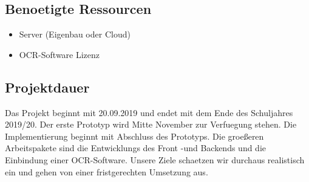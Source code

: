 \documentclass[12pt]{article}
\theoremstyle{definition}
\begin{document}
\subsection{Benoetigte Ressourcen}

\begin{itemize}
\item Server (Eigenbau oder Cloud)
\item OCR-Software Lizenz
\end{itemize}

\subsection{Projektdauer}
Das Projekt beginnt mit 20.09.2019 und endet mit dem Ende des Schuljahres 2019/20. Der erste Prototyp wird Mitte November zur Verfuegung stehen. Die Implementierung beginnt mit Abschluss des Prototyps. Die groeßeren Arbeitspakete sind die Entwicklungs des Front -und Backends und die Einbindung einer OCR-Software. Unsere Ziele schaetzen wir durchaus realistisch ein und gehen von einer fristgerechten Umsetzung aus.
\end{document}
